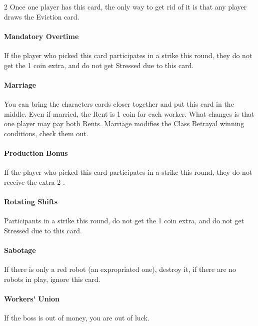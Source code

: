 \begin{multicols}{2}
            Once one player has this card, the only way to get rid of it is that
            any player draws the Eviction card.
    
        \paragraph{Mandatory Overtime}
    
            If the player who picked this card participates in a strike
            this round, they do not get the 1 coin extra, and do not get Stressed due to this
            card.
    
        \paragraph{Marriage}
    
            You can bring the characters cards closer together and put this card
            in the middle. Even if married, the Rent is 1 coin for each worker. What changes
            is that one player may pay both Rents. Marriage modifies the Class Betrayal winning
            conditions, check them out.
    
        \paragraph{Production Bonus}
    
            If the player who picked this card participates in a strike this
            round, they do not receive the extra 2 \faRubleSign.
    
        \paragraph{Rotating Shifts}
    
            Participants in a strike this round, do not get the 1 coin extra,
            and do not get Stressed due to this card.
    
        \paragraph{Sabotage}
    
            If there is only a red robot (an expropriated one), destroy it, if there
            are no robots in play, ignore this card.
    
        \paragraph{Workers' Union}
    
            If the boss is out of money, you are out of luck.
    
    \end{multicols}

